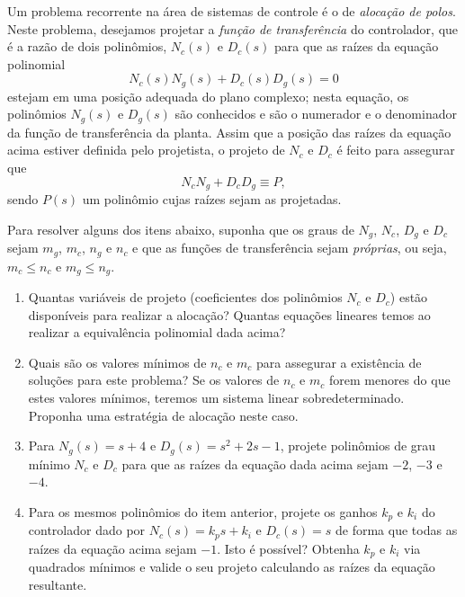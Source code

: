 \begin{problem}
Um problema recorrente na área de sistemas de controle é o de {\em alocação de polos}. Neste problema, desejamos projetar a {\em função de transferência} do controlador, que é a razão de dois polinômios, $N_c(s)$ e $D_c(s)$ para que as raízes da equação polinomial
\[
N_c(s) N_g(s) + D_c (s) D_g(s) = 0
\]
estejam em uma posição adequada do plano complexo; nesta equação, os polinômios $N_g(s)$ e $D_g(s)$ são conhecidos e são o numerador e o denominador da função de transferência da planta. Assim que a posição das raízes da equação acima estiver definida pelo projetista, o projeto de $N_c$ e $D_c$ é feito para assegurar que
\[
N_c N_g + D_c D_g \equiv P,
\]
sendo $P(s)$ um polinômio cujas raízes sejam as projetadas.

Para resolver alguns dos itens abaixo, suponha que os graus de $N_g$, $N_c$, $D_g$ e $D_c$ sejam $m_g$, $m_c$, $n_g$ e $n_c$ e que as funções de transferência sejam {\em próprias}, ou seja, $m_c \leq n_c$ e $m_g \leq n_g$.
\begin{enumerate}[label=(\alph*)]
\item Quantas variáveis de projeto (coeficientes dos polinômios $N_c$ e $D_c$) estão disponíveis para realizar a alocação? Quantas equações lineares temos ao realizar a equivalência polinomial dada acima? 
\item Quais são os valores mínimos de $n_c$ e $m_c$ para assegurar a existência de soluções para este problema? Se os valores de $n_c$ e $m_c$ forem menores do que estes valores mínimos, teremos um sistema linear sobredeterminado. Proponha uma estratégia de alocação neste caso.
\item Para $N_g(s) = s + 4$ e $D_g(s) = s^2 + 2s - 1$, projete polinômios de grau mínimo $N_c$ e $D_c$ para que as raízes da equação dada acima sejam $-2$, $-3$ e $-4$.
\item Para os mesmos polinômios do item anterior, projete os ganhos $k_p$ e $k_i$ do controlador dado por $N_c(s) = k_p s + k_i$ e $D_c(s) = s$ de forma que todas as raízes da equação acima sejam $-1$. Isto é possível? Obtenha $k_p$ e $k_i$ via quadrados mínimos e valide o seu projeto calculando as raízes da equação resultante.
\end{enumerate}
\end{problem}

